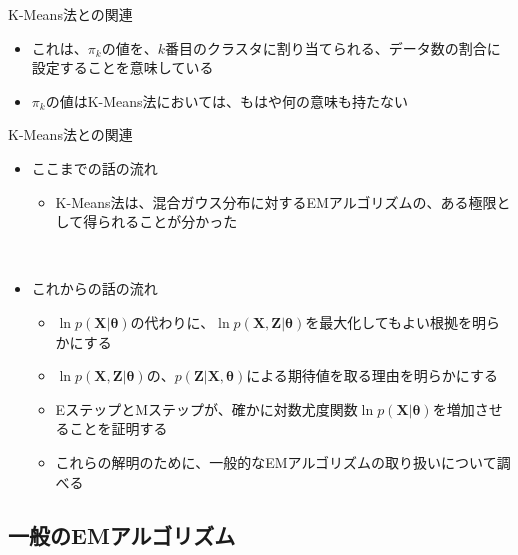\documentclass[dvipdfmx,notheorems,t]{beamer}
\begin{document}
\begin{frame}{K-Means法との関連}
\begin{itemize}
\begin{itemize}
		\item これは、$\pi_k$の値を、$k$番目のクラスタに割り当てられる、データ数の割合に設定することを意味している
		\item $\pi_k$の値はK-Means法においては、もはや何の意味も持たない
	\end{itemize}
\end{itemize}

\end{frame}

\begin{frame}{K-Means法との関連}

\begin{itemize}
	\item ここまでの話の流れ
	\begin{itemize}
		\item K-Means法は、混合ガウス分布に対するEMアルゴリズムの、\alert{ある極限として得られる}ことが分かった
	\end{itemize} \
	
	\item これからの話の流れ
	\begin{itemize}
		\item $\ln p(\bm{X} | \bm{\theta})$の代わりに、\color{red}$\ln p(\bm{X}, \bm{Z} | \bm{\theta})$を最大化してもよい根拠\normalcolor を明らかにする
		\item $\ln p(\bm{X}, \bm{Z} | \bm{\theta})$の、$p(\bm{Z} | \bm{X}, \bm{\theta})$による\alert{期待値を取る理由}を明らかにする
		\item EステップとMステップが、確かに\color{red}対数尤度関数$\ln p(\bm{X} | \bm{\theta})$を増加させる\normalcolor ことを証明する
		\item これらの解明のために、一般的なEMアルゴリズムの取り扱いについて調べる
	\end{itemize}
\end{itemize}

\end{frame}

\subsection{一般のEMアルゴリズム}
\end{document}
